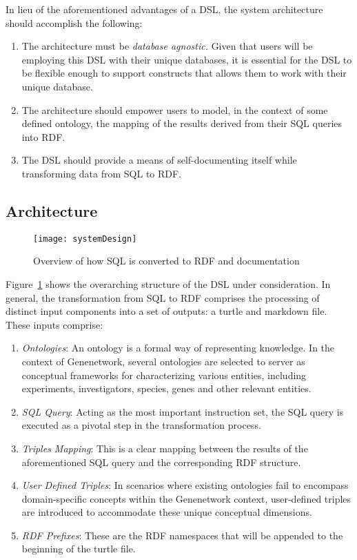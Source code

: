 In lieu of the aforementioned advantages of a DSL, the system architecture should accomplish the following:

\begin{enumerate}
\item The architecture must be \textit{database agnostic.}  Given that users will be employing this DSL with their unique databases, it is essential for the DSL to be flexible enough to support constructs that allows them to work with their unique database.
\item The architecture should empower users to model, in the context of some defined ontology, the mapping of the results derived from their SQL queries into RDF\@.
\item The DSL should provide a means of self-documenting itself while transforming data from SQL to RDF\@.
\end{enumerate}

\subsection{Architecture}
\begin{figure}[H]
  \centering
  \texttt{[image: systemDesign]}
  \caption{Overview of how SQL is converted to RDF and documentation}\label{fig:system-diagram}
  \centering
\end{figure}

Figure~\ref{fig:system-diagram} shows the overarching structure of the DSL under consideration.  In general, the transformation from SQL to RDF comprises the processing of distinct input components into a set of outputs: a turtle and markdown file.  These inputs comprise:

\begin{enumerate}
\item \textit{Ontologies}: An ontology is a formal way of representing knowledge.  In the context of Genenetwork, several ontologies are selected to server as conceptual frameworks for characterizing various entities, including experiments, investigators, species, genes and other relevant entities.
\item \textit{SQL Query}: Acting as the most important instruction set, the SQL query is executed as a pivotal step in the transformation process.
\item \textit{Triples Mapping}: This is a clear mapping between the results of the aforementioned SQL query and the corresponding RDF structure.
\item \textit{User Defined Triples}: In scenarios where existing ontologies fail to encompass domain-specific concepts within the Genenetwork context, user-defined triples are introduced to accommodate these unique conceptual dimensions.
\item \textit{RDF Prefixes}: These are the RDF namespaces that will be appended to the beginning of the turtle file.
\end{enumerate}

